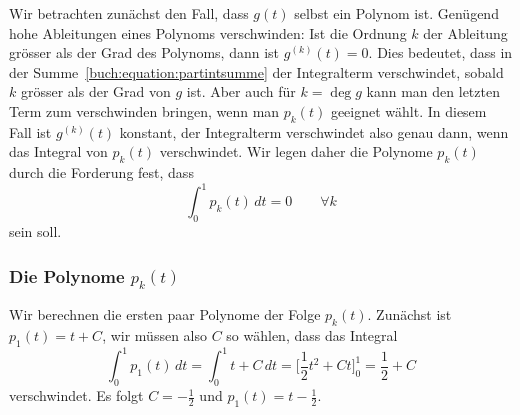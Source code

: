 Wir betrachten zunächst den Fall, dass $g(t)$ selbst ein Polynom ist.
Genügend hohe Ableitungen eines Polynoms verschwinden: Ist die Ordnung $k$
der Ableitung grösser als der Grad des Polynoms, dann ist $g^{(k)}(t)=0$.
Dies bedeutet, dass in der Summe~\eqref{buch:equation:partintsumme}
der Integralterm verschwindet, sobald $k$ grösser als der Grad von $g$ ist.
Aber auch für $k=\deg g$ kann man den letzten Term zum verschwinden
bringen, wenn man $p_k(t)$ geeignet wählt.
In diesem Fall ist $g^{(k)}(t)$ konstant, der Integralterm verschwindet
also genau dann, wenn das Integral von $p_k(t)$ verschwindet.
Wir legen daher die Polynome $p_k(t)$ durch die Forderung fest, dass
\begin{equation}
\int_0^1 p_k(t)\,dt = 0\qquad\forall k
\label{buch:integral:equation:integralbedingung}
\end{equation}
sein soll.

\subsubsection{Die Polynome $p_k(t)$}
Wir berechnen die ersten paar Polynome der Folge $p_k(t)$.
Zunächst ist $p_1(t) = t+C$, wir müssen also $C$ so wählen, dass
das Integral
\[
\int_0^1 p_1(t)\,dt
=
\int_0^1 t+C\,dt
=
\biggl[\frac12t^2 + Ct\biggr]_0^1
=
\frac12 + C
\]
verschwindet.
Es folgt $C=-\frac12$ und $p_1(t)=t-\frac12$.

